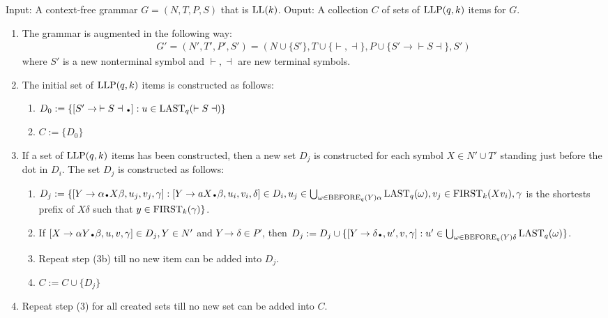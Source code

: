 \begin{algorithm}
    Input: A context-free grammar $G = (N, T, P, S)$ that is $\text{LL}(k)$. Ouput: A collection $C$ of sets of $\text{LLP}(q, k)$ items for $G$.
    \begin{enumerate}
        \item The grammar is augmented in the following way:
        \begin{align*}
            G' = (N', T', P', S') = (N \cup \{S'\}, T \cup \{\vdash, \dashv\}, P \cup \{S' \to \vdash S \dashv\}, S')
        \end{align*}
        where $S'$ is a new nonterminal symbol and $\vdash, \dashv$ are new terminal symbols.
        \item The initial set of $\text{LLP}(q, k)$ items is constructed as follows:
        \begin{enumerate}
            \item $D_0 := \{[S' \to \: \vdash S \dashv \bigdot  ] : u \in \LAST_q(\vdash S \dashv) \}$
            \item $C := \{D_0\}$
        \end{enumerate}
        \item If a set of $\text{LLP}(q, k)$ items has been constructed, then a new set $D_j$ is constructed
        for each symbol $X \in N' \cup T'$ standing just before the dot in $D_i$. The set $D_j$ is constructed as follows:
        \begin{enumerate}
            \item $D_j := \{[Y \to \alpha\bigdot X \beta, u_j, v_j, \gamma] : [Y \to aX\bigdot\beta, u_i, v_i, \delta] \in D_i, u_j \in \bigcup_{\omega \in \BEFORE_q(Y) \alpha} \LAST_q(\omega), v_j \in \FIRST_k(Xv_i), \gamma$ is the shortests prefix of $X\delta$ such that $y \in \text{FIRST}_k(\gamma)\}$.
            \item If $[X \to \alpha Y\bigdot \beta, u, v,\gamma] \in D_j, Y \in N'$ and $Y \to \delta \in P'$, then $D_j := D_j \cup \{[Y \to \delta \bigdot , u', v, \gamma] : u' \in \bigcup_{\omega \in \BEFORE_q(Y) \delta} \LAST_q(\omega)\}$.
            \item Repeat step (3b) till no new item can be added into $D_j$.
            \item $C := C \cup \{D_j\}$
        \end{enumerate}
        \item Repeat step (3) for all created sets till no new set can be added into $C$.
    \end{enumerate}
\end{algorithm}
